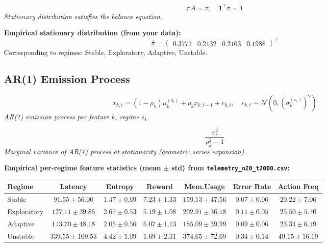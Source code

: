\documentclass[12pt]{article}
\begin{document}
\begin{equation}
\pi A = \pi, \quad \mathbf{1}^\top \pi = 1
\end{equation}
\noindent\textit{Stationary distribution satisfies the balance equation.}


\noindent\textbf{Empirical stationary distribution (from your data):}
\begin{equation}
\hat{\pi} = \begin{pmatrix}0.3777 & 0.2132 & 0.2103 & 0.1988\end{pmatrix}^\top
\end{equation}
Corresponding to regimes: Stable, Exploratory, Adaptive, Unstable.



\subsection{AR(1) Emission Process}

\begin{equation}
x_{k,t} = (1 - \rho_k)\mu_k^{(s_t)} + \rho_k x_{k,t-1} + \varepsilon_{k,t},\quad \varepsilon_{k,t} \sim \mathcal{N}\!\left(0,(\sigma_k^{(s_t)})^2\right)
\end{equation}
\noindent\textit{AR(1) emission process per feature $k$, regime $s_t$.}


\begin{equation}
\frac{\sigma_{s}^{2}}{\rho_{k}^{2} - 1}
\end{equation}
\noindent\textit{Marginal variance of AR(1) process at stationarity (geometric series expansion).}


\noindent\textbf{Empirical per-regime feature statistics (mean $\pm$ std) from \texttt{telemetry\_n20\_t2000.csv}:}

\begin{center}\begin{tabular}{lcccccc}\toprule
Regime & Latency & Entropy & Reward & Mem.Usage & Error Rate & Action Freq \\ \midrule

Stable & $91.55\pm56.00$ & $1.47\pm0.69$ & $7.23\pm1.33$ & $159.13\pm47.56$ & $0.07\pm0.06$ & $20.22\pm7.06$ \\

Exploratory & $127.11\pm39.85$ & $2.67\pm0.53$ & $5.19\pm1.08$ & $202.91\pm36.18$ & $0.11\pm0.05$ & $25.50\pm5.70$ \\

Adaptive & $113.70\pm48.18$ & $2.05\pm0.56$ & $6.07\pm1.13$ & $185.09\pm39.99$ & $0.09\pm0.06$ & $23.34\pm6.19$ \\

Unstable & $339.55\pm109.53$ & $4.42\pm1.09$ & $1.69\pm2.31$ & $374.65\pm72.69$ & $0.34\pm0.14$ & $49.15\pm16.19$ \\

\bottomrule\end{tabular}\end{center}
\end{document}
